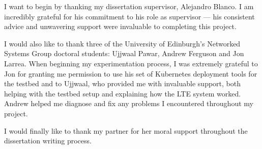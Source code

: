 I want to begin by thanking my dissertation supervisor, Alejandro Blanco. I am incredibly grateful for his commitment to his role as supervisor — his consistent advice and unwavering support were invaluable to completing this project.

I would also like to thank three of the University of Edinburgh’s Networked Systems Group doctoral students: Ujjwaal Pawar, Andrew Ferguson and Jon Larrea. When beginning my experimentation process, I was extremely grateful to Jon for granting me permission to use his set of Kubernetes deployment tools for the testbed and to Ujjwaal, who provided me with invaluable support, both helping with the testbed setup and explaining how the LTE system worked. Andrew helped me diagnose and fix any problems I encountered throughout my project.

I would finally like to thank my partner for her moral support throughout the dissertation writing process.